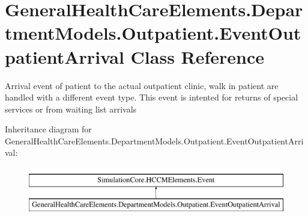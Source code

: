 \hypertarget{class_general_health_care_elements_1_1_department_models_1_1_outpatient_1_1_event_outpatient_arrival}{}\section{General\+Health\+Care\+Elements.\+Department\+Models.\+Outpatient.\+Event\+Outpatient\+Arrival Class Reference}
\label{class_general_health_care_elements_1_1_department_models_1_1_outpatient_1_1_event_outpatient_arrival}


Arrival event of patient to the actual outpatient clinic, walk in patient are handled with a different event type. This event is intented for returns of special services or from waiting list arrivals  


Inheritance diagram for General\+Health\+Care\+Elements.\+Department\+Models.\+Outpatient.\+Event\+Outpatient\+Arrival\+:\begin{figure}[H]
\begin{center}
\leavevmode
\includegraphics[height=2.000000cm]{class_general_health_care_elements_1_1_department_models_1_1_outpatient_1_1_event_outpatient_arrival}
\end{center}
\end{figure}

